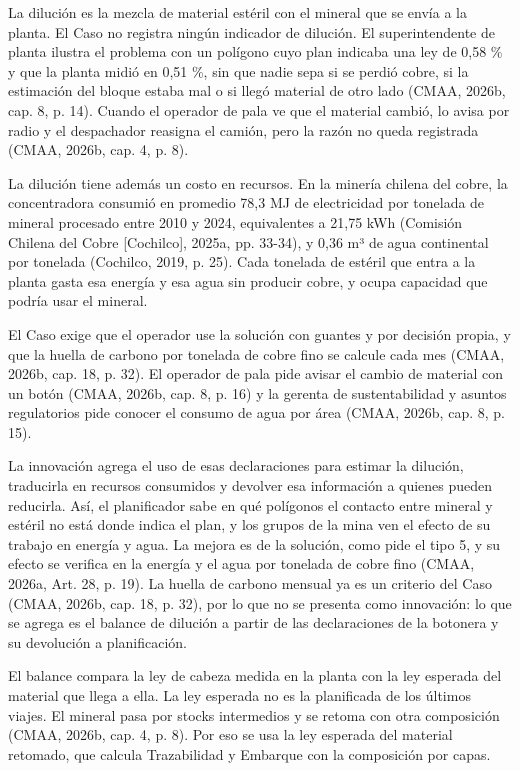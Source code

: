 \documentclass[subdoc]{../../comun/overfore}
\begin{document}
La dilución es la mezcla de material estéril con el mineral que se envía a la planta. El Caso no registra ningún indicador de dilución. El superintendente de planta ilustra el problema con un polígono cuyo plan indicaba una ley de 0,58 \% y que la planta midió en 0,51 \%, sin que nadie sepa si se perdió cobre, si la estimación del bloque estaba mal o si llegó material de otro lado (CMAA, 2026b, cap. 8, p. 14). Cuando el operador de pala ve que el material cambió, lo avisa por radio y el despachador reasigna el camión, pero la razón no queda registrada (CMAA, 2026b, cap. 4, p. 8).

La dilución tiene además un costo en recursos. En la minería chilena del cobre, la concentradora consumió en promedio 78,3 MJ de electricidad por tonelada de mineral procesado entre 2010 y 2024, equivalentes a 21,75 kWh (Comisión Chilena del Cobre [Cochilco], 2025a, pp. 33-34), y 0,36 m³ de agua continental por tonelada (Cochilco, 2019, p. 25). Cada tonelada de estéril que entra a la planta gasta esa energía y esa agua sin producir cobre, y ocupa capacidad que podría usar el mineral.

El Caso exige que el operador use la solución con guantes y por decisión propia, y que la huella de carbono por tonelada de cobre fino se calcule cada mes (CMAA, 2026b, cap. 18, p. 32). El operador de pala pide avisar el cambio de material con un botón (CMAA, 2026b, cap. 8, p. 16) y la gerenta de sustentabilidad y asuntos regulatorios pide conocer el consumo de agua por área (CMAA, 2026b, cap. 8, p. 15).

La innovación agrega el uso de esas declaraciones para estimar la dilución, traducirla en recursos consumidos y devolver esa información a quienes pueden reducirla. Así, el planificador sabe en qué polígonos el contacto entre mineral y estéril no está donde indica el plan, y los grupos de la mina ven el efecto de su trabajo en energía y agua. La mejora es de la solución, como pide el tipo 5, y su efecto se verifica en la energía y el agua por tonelada de cobre fino (CMAA, 2026a, Art. 28, p. 19). La huella de carbono mensual ya es un criterio del Caso (CMAA, 2026b, cap. 18, p. 32), por lo que no se presenta como innovación: lo que se agrega es el balance de dilución a partir de las declaraciones de la botonera y su devolución a planificación.

El balance compara la ley de cabeza medida en la planta con la ley esperada del material que llega a ella. La ley esperada no es la planificada de los últimos viajes. El mineral pasa por stocks intermedios y se retoma con otra composición (CMAA, 2026b, cap. 4, p. 8). Por eso se usa la ley esperada del material retomado, que calcula Trazabilidad y Embarque con la composición por capas.
\end{document}
